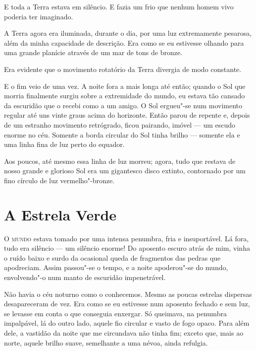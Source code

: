 E toda a Terra estava em silêncio. E fazia um frio que nenhum homem vivo poderia ter imaginado.

A Terra agora era iluminada, durante o dia, por uma luz extremamente pesarosa, além da minha capacidade de descrição. Era
como se eu estivesse olhando para uma grande planície através de um mar de tons de bronze.

Era evidente que o movimento rotatório da Terra divergia de modo constante.

E o fim veio de uma vez. A noite fora a mais longa até então; quando o Sol que morria finalmente surgiu sobre a
extremidade do mundo, eu estava tão cansado da escuridão que o recebi como a um amigo. O Sol ergueu"-se num movimento
regular até uns vinte graus acima do horizonte. Então parou de repente e, depois de um estranho movimento retrógrado,
ficou pairando, imóvel --- um escudo enorme no céu. 
Somente a borda circular do Sol tinha brilho --- somente ela e uma
linha fina de luz perto do equador.

Aos poucos, até mesmo essa linha de luz morreu; agora, tudo que restava de nosso grande e glorioso Sol era um
gigantesco disco extinto, contornado por um fino círculo de luz vermelho"-bronze.


\clearpage

\chapter{A Estrela Verde}

\textsc{O mundo} estava tomado por uma intensa penumbra, fria e insuportável. Lá fora, tudo era silêncio --- um silêncio
enorme! Do aposento escuro atrás de mim, vinha o ruído baixo e surdo da ocasional queda de fragmentos das pedras
que apodreciam. Assim passou"-se o tempo, e a noite apoderou"-se do mundo, envolvendo"-o num manto de escuridão
impenetrável.

Não havia o céu noturno como o conhecemos. Mesmo as poucas estrelas dispersas desapareceram de vez. Era como se eu
estivesse num aposento fechado e sem luz, se levasse em conta o que conseguia enxergar. Só queimava, na penumbra
impalpável, lá do outro lado, aquele fio circular e vasto de fogo opaco. Para além dele, a vastidão da noite que me
circundava não tinha fim; exceto que, mais ao norte, aquele brilho suave, semelhante a uma névoa, ainda refulgia.

